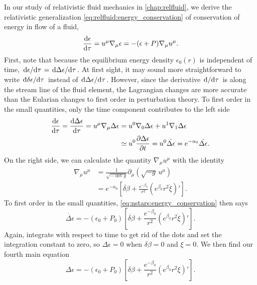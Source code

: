 In our study of relativistic fluid mechanics in \cref{chap:relfluid}, we derive the relativistic generalization \eqref{eq:relfluid:energy_conservation} of conservation of energy in flow of a fluid,
\begin{equation}
	\odv{\epsilon}{\tau} = u^\mu \nabla_\mu \epsilon = -(\epsilon+P) \nabla_\mu u^\mu  .
\label{eq:nstars:energy_conservation}
\end{equation}
First, note that because the equilibrium energy density $\epsilon_0(r)$ is independent of time, $\odv{\epsilon}/{\tau} = \odv{\Delta \epsilon}/{\tau}$.
At first sight, it may sound more straightforward to write $\odv{\delta \epsilon}/{\tau}$ instead of $\odv{\Delta \epsilon}/{\tau}$.
However, since the derivative $\odv{}/{\tau}$ is along the stream line of the fluid element, the Lagrangian changes are more accurate than the Eularian changes to first order in perturbation theory.
To first order in the small quantities, only the time component contributes to the left side
\begin{equation}
\begin{split}
	\odv{\epsilon}{\tau} =
	\odv{\Delta \epsilon}{\tau} =
	u^\mu \nabla_\mu \Delta \epsilon &=
	u^0 \nabla_0 \Delta \epsilon + u^1 \nabla_1 \Delta \epsilon \\
	&\taylor u^0 \pdv{\Delta \epsilon}{t} = u^0 \dot{\Delta \epsilon} =
	e^{-\alpha_0} \dot{\Delta \epsilon} .
\end{split}
\end{equation}
On the right side, we can calculate the quantity $\nabla_\mu u^\mu$ with the identity
\begin{equation}
\begin{split}
	\nabla_\mu u^\mu &= \frac{1}{\sqrt{-\det{g}}} \partial_\mu \left( \sqrt{-g} \, u^\mu \right) \\
	                 &= e^{-\alpha_0} \left[ \dot{\delta\beta} + \frac{e^{-\beta_0}}{r^2} \left( e^{\beta_0} r^2 \dot\xi \right)' \right] .
\end{split}
\end{equation}
To first order in the small quantities, \cref{eq:nstars:energy_conservation} then says
\begin{equation}
	\dot{\Delta \epsilon} = - \left( \epsilon_0 + P_0 \right) \left[ \dot{\delta\beta} + \frac{e^{-\beta_0}}{r^2} \left( e^{\beta_0} r^2 \dot\xi \right)' \right] .
\end{equation}
Again, integrate with respect to time to get rid of the dots and set the integration constant to zero, so $\Delta \epsilon = 0$ when $\delta \beta = 0$ and $\xi = 0$.
We then find our fourth main equation
\begin{equation}
	\Delta \epsilon = - \left( \epsilon_0 + P_0 \right) \left[ \delta\beta + \frac{e^{-\beta_0}}{r^2} \left( e^{\beta_0} r^2 \xi \right)' \right] .
\label{eq:nstars:Delta_epsilon}
\end{equation}

